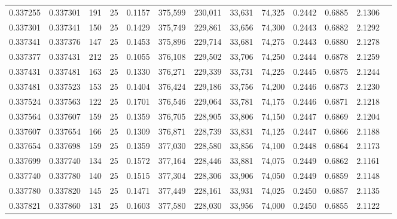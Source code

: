 \begin{tabular}{rrrrrrrrrrrrr}
0.337255 & 0.337301 &   191 &  25 &                                     0.1157 & 375,599 & 230,011 &  33,631 &  74,325 & 0.2442 & 0.6885 & 2.1306 \\
0.337301 & 0.337341 &   150 &  25 &                                     0.1429 & 375,749 & 229,861 &  33,656 &  74,300 & 0.2443 & 0.6882 & 2.1292 \\
0.337341 & 0.337376 &   147 &  25 &                                     0.1453 & 375,896 & 229,714 &  33,681 &  74,275 & 0.2443 & 0.6880 & 2.1278 \\
0.337377 & 0.337431 &   212 &  25 &                                     0.1055 & 376,108 & 229,502 &  33,706 &  74,250 & 0.2444 & 0.6878 & 2.1259 \\
0.337431 & 0.337481 &   163 &  25 &                                     0.1330 & 376,271 & 229,339 &  33,731 &  74,225 & 0.2445 & 0.6875 & 2.1244 \\
0.337481 & 0.337523 &   153 &  25 &                                     0.1404 & 376,424 & 229,186 &  33,756 &  74,200 & 0.2446 & 0.6873 & 2.1230 \\
0.337524 & 0.337563 &   122 &  25 &                                     0.1701 & 376,546 & 229,064 &  33,781 &  74,175 & 0.2446 & 0.6871 & 2.1218 \\
0.337564 & 0.337607 &   159 &  25 &                                     0.1359 & 376,705 & 228,905 &  33,806 &  74,150 & 0.2447 & 0.6869 & 2.1204 \\
0.337607 & 0.337654 &   166 &  25 &                                     0.1309 & 376,871 & 228,739 &  33,831 &  74,125 & 0.2447 & 0.6866 & 2.1188 \\
0.337654 & 0.337698 &   159 &  25 &                                     0.1359 & 377,030 & 228,580 &  33,856 &  74,100 & 0.2448 & 0.6864 & 2.1173 \\
0.337699 & 0.337740 &   134 &  25 &                                     0.1572 & 377,164 & 228,446 &  33,881 &  74,075 & 0.2449 & 0.6862 & 2.1161 \\
0.337740 & 0.337780 &   140 &  25 &                                     0.1515 & 377,304 & 228,306 &  33,906 &  74,050 & 0.2449 & 0.6859 & 2.1148 \\
0.337780 & 0.337820 &   145 &  25 &                                     0.1471 & 377,449 & 228,161 &  33,931 &  74,025 & 0.2450 & 0.6857 & 2.1135 \\
0.337821 & 0.337860 &   131 &  25 &                                     0.1603 & 377,580 & 228,030 &  33,956 &  74,000 & 0.2450 & 0.6855 & 2.1122 \\

\end{tabular}
